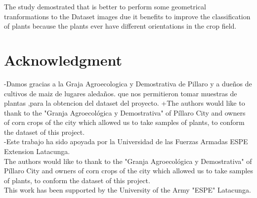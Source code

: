\documentclass[conference]{IEEEtran}
\begin{document}
The study demostrated that is better to perform some geometrical tranformations to the Dataset images due it benefits to improve the  classification of plants because the plants ever have different orientations in the crop field. 






\section*{Acknowledgment}

-Damos gracias a la Graja Agroecologica y Demostrativa de Pillaro y a dueños de cultivos de maiz de lugares aledaños.  que nos permitieron tomar muestras de plantas ,para la obtencion del dataset del proyecto.
+The authors would like to thank to the "Granja Agroecol\'ogica y Demostrativa" of P\'illaro City and owners of corn crops of the city which allowed us to take samples of plants, to conform the dataset of this project. \\
-Este trabajo ha sido apoyada por la Universidad de las Fuerzas Armadas ESPE Extension Latacunga. \\

The authors would like to thank to the "Granja Agroecol\'ogica y Demostrativa" of P\'illaro City and owners of corn crops of the city which allowed us to take samples of plants, to conform the dataset of this project. \\

This work has been supported by the University of the Army "ESPE"  Latacunga.  




%
%
%







\end{document}
